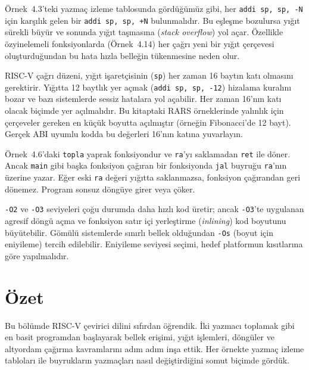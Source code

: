 
Örnek~4.3'teki yazmaç izleme tablosunda gördüğümüz gibi, her \texttt{addi sp, sp, -N} için karşılık gelen bir \texttt{addi sp, sp, +N} bulunmalıdır. Bu eşleşme bozulursa yığıt sürekli büyür ve sonunda yığıt taşmasına (\emph{stack overflow}) yol açar. Özellikle özyinelemeli fonksiyonlarda (Örnek~4.14) her çağrı yeni bir yığıt çerçevesi oluşturduğundan bu hata hızla belleğin tükenmesine neden olur.


RISC-V çağrı düzeni, yığıt işaretçisinin (\texttt{sp}) her zaman 16 baytın katı olmasını gerektirir. Yığıtta 12 baytlık yer açmak (\texttt{addi sp, sp, -12}) hizalama kuralını bozar ve bazı sistemlerde sessiz hatalara yol açabilir. Her zaman 16'nın katı olacak biçimde yer açılmalıdır. Bu kitaptaki RARS örneklerinde yalınlık için çerçeveler gereken en küçük boyutta açılmıştır (örneğin Fibonacci'de 12 bayt). Gerçek ABI uyumlu kodda bu değerleri 16'nın katına yuvarlayın.


Örnek~4.6'daki \texttt{topla} yaprak fonksiyondur ve \texttt{ra}'yı saklamadan \texttt{ret} ile döner. Ancak \texttt{main} gibi başka fonksiyon çağıran bir fonksiyonda \texttt{jal} buyruğu \texttt{ra}'nın üzerine yazar. Eğer eski \texttt{ra} değeri yığıtta saklanmazsa, fonksiyon çağırandan geri dönemez. Program sonsuz döngüye girer veya çöker.


\texttt{-O2} ve \texttt{-O3} seviyeleri çoğu durumda daha hızlı kod üretir; ancak \texttt{-O3}'te uygulanan agresif döngü açma ve fonksiyon satır içi yerleştirme (\emph{inlining}) kod boyutunu büyütebilir. Gömülü sistemlerde sınırlı bellek olduğundan \texttt{-Os} (boyut için eniyileme) tercih edilebilir. Eniyileme seviyesi seçimi, hedef platformun kısıtlarına göre yapılmalıdır.


\section{Özet}
\label{sec:ozet-programlama}

Bu bölümde RISC-V çevirici dilini sıfırdan öğrendik. İki yazmacı toplamak gibi en basit programdan başlayarak bellek erişimi, yığıt işlemleri, döngüler ve altyordam çağırma kavramlarını adım adım inşa ettik. Her örnekte yazmaç izleme tabloları ile buyrukların yazmaçları nasıl değiştirdiğini somut biçimde gördük.

